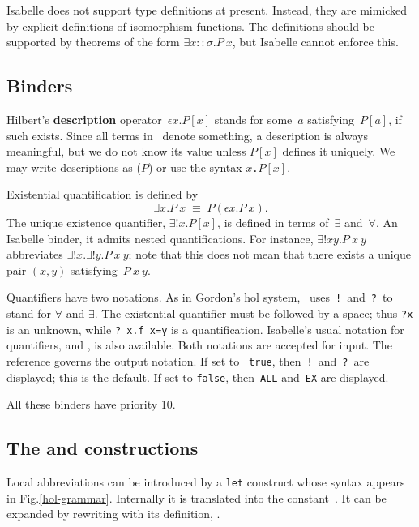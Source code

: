 Isabelle does not support type definitions at present.  Instead, they are
mimicked by explicit definitions of isomorphism functions.  The definitions
should be supported by theorems of the form $\exists x::\sigma.P~x$, but
Isabelle cannot enforce this.


\subsection{Binders}
Hilbert's {\bf description} operator~$\epsilon x.P[x]$ stands for some~$a$
satisfying~$P[a]$, if such exists.  Since all terms in \HOL\ denote
something, a description is always meaningful, but we do not know its value
unless $P[x]$ defines it uniquely.  We may write descriptions as
($P$) or use the syntax
\hbox{\tt \at $x$.$P[x]$}.

Existential quantification is defined by
\[ \exists x.P~x \;\equiv\; P(\epsilon x.P~x). \]
The unique existence quantifier, $\exists!x.P[x]$, is defined in terms
of~$\exists$ and~$\forall$.  An Isabelle binder, it admits nested
quantifications.  For instance, $\exists!x y.P~x~y$ abbreviates
$\exists!x. \exists!y.P~x~y$; note that this does not mean that there
exists a unique pair $(x,y)$ satisfying~$P~x~y$.

Quantifiers have two notations.  As in Gordon's {\sc hol} system, \HOL\
uses~{\tt!}\ and~{\tt?}\ to stand for $\forall$ and $\exists$.  The
existential quantifier must be followed by a space; thus {\tt?x} is an
unknown, while \verb'? x.f x=y' is a quantification.  Isabelle's usual
notation for quantifiers, \sdx{ALL} and \sdx{EX}, is also
available.  Both notations are accepted for input.  The {\ML} reference
\ttindexbold{HOL_quantifiers} governs the output notation.  If set to {\tt
true}, then~{\tt!}\ and~{\tt?}\ are displayed; this is the default.  If set
to {\tt false}, then~{\tt ALL} and~{\tt EX} are displayed.

All these binders have priority 10. 


\subsection{The  and  constructions}
Local abbreviations can be introduced by a {\tt let} construct whose
syntax appears in Fig.\ts\ref{hol-grammar}.  Internally it is translated into
the constant~\cdx{Let}.  It can be expanded by rewriting with its
definition, \tdx{Let_def}.

